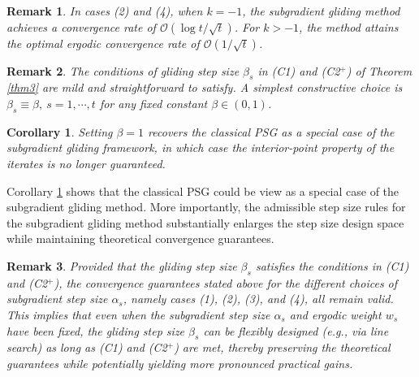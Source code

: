 \documentclass[sn-mathphys]{JORSC-jnl}%
\theoremstyle{thmstyleone}%
\newtheorem{remark}{Remark}[section]%
\newtheorem{corollary}{Corollary}[section]%
\theoremstyle{thmstylethree}%
\begin{document}
\begin{remark}
	In cases (2) and (4), when $k = -1$, the subgradient gliding method achieves a convergence rate of $\mathcal{O}\left(\log t / \sqrt{t}\right)$. For $k > -1$, the method attains the optimal ergodic convergence rate of $\mathcal{O}\left(1 / \sqrt{t}\right)$.
\end{remark}

\begin{remark}
	The conditions of gliding step size $\beta_s$ in (C1) and (C2$^+$) of Theorem \ref{thm3} are mild and straightforward to satisfy. A simplest constructive choice is $\beta_s\equiv \beta, ~s=1,\cdots,t$ for any fixed constant $\beta \in (0,1)$.
\end{remark}

\begin{corollary}\label{PSG_special1}
	Setting $\beta = 1$ recovers the classical PSG as a special case of the subgradient gliding framework, in which case the interior-point property of the iterates is no longer guaranteed.
\end{corollary}

Corollary \ref{PSG_special1} shows that the classical PSG could be view as a special case of the subgradient gliding method. More importantly, the admissible step size rules for the subgradient gliding method substantially enlarges the step size design space while maintaining theoretical convergence guarantees.

\begin{remark}
	Provided that the gliding step size $\beta_s$ satisfies the conditions in (C1) and (C2$^+$), the convergence guarantees stated above for the different choices of subgradient step size $\alpha_s$, namely cases (1), (2), (3), and (4), all remain valid. This implies that even when the subgradient step size $\alpha_s$ and ergodic weight $w_s$ have been fixed, the gliding step size $\beta_s$ can be flexibly designed (e.g., via line search) as long as (C1) and (C2$^+$) are met, thereby preserving the theoretical guarantees while potentially yielding more pronounced practical gains.
\end{remark}

\end{document}
